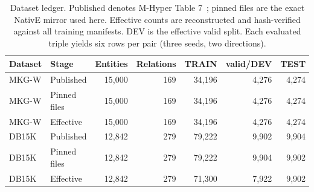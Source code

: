 \begin{table}[tbp]
\centering\small
\caption{Dataset ledger. Published denotes M-Hyper Table 7~\citep{mhyper}; pinned files are the exact NativE mirror used here. Effective counts are reconstructed and hash-verified against all training manifests. DEV is the effective valid split. Each evaluated triple yields six rows per pair (three seeds, two directions).}
\label{tab:data}
\begin{tabular}{llrrrrr}
\toprule
Dataset & Stage & Entities & Relations & TRAIN & valid/DEV & TEST\\
\midrule
MKG-W & Published & 15,000 & 169 & 34,196 & 4,276 & 4,274\\
MKG-W & Pinned files & 15,000 & 169 & 34,196 & 4,276 & 4,274\\
MKG-W & Effective & 15,000 & 169 & 34,196 & 4,276 & 4,274\\
DB15K & Published & 12,842 & 279 & 79,222 & 9,902 & 9,904\\
DB15K & Pinned files & 12,842 & 279 & 79,222 & 9,904 & 9,902\\
DB15K & Effective & 12,842 & 279 & 71,300 & 7,922 & 9,902\\
\bottomrule
\end{tabular}
\end{table}
